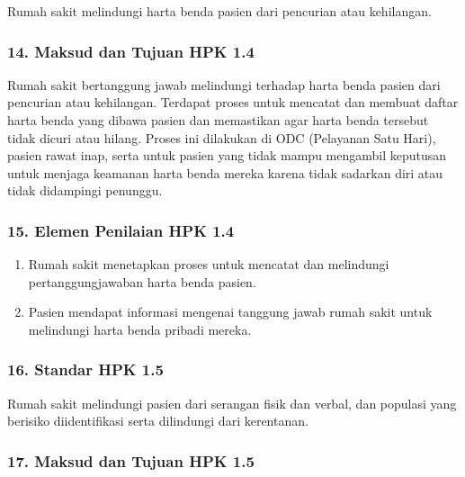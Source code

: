 \documentclass[
]{book}
\providecommand{\tightlist}{%
  \setlength{\itemsep}{0pt}\setlength{\parskip}{0pt}}
\begin{document}
Rumah sakit melindungi harta benda pasien dari pencurian atau kehilangan.

\hypertarget{maksud-dan-tujuan-hpk-1.4}{%
\subsubsection*{14. Maksud dan Tujuan HPK 1.4}\label{maksud-dan-tujuan-hpk-1.4}}

Rumah sakit bertanggung jawab melindungi terhadap harta benda pasien dari pencurian atau kehilangan. Terdapat proses untuk mencatat dan membuat daftar harta benda yang dibawa pasien dan memastikan agar harta benda tersebut tidak dicuri atau hilang. Proses ini dilakukan di ODC (Pelayanan Satu Hari), pasien rawat inap, serta untuk pasien yang tidak mampu mengambil keputusan untuk menjaga keamanan harta benda mereka karena tidak sadarkan diri atau tidak didampingi penunggu.

\hypertarget{elemen-penilaian-hpk-1.4}{%
\subsubsection*{15. Elemen Penilaian HPK 1.4}\label{elemen-penilaian-hpk-1.4}}

\begin{enumerate}
\def\labelenumi{\alph{enumi}.}
\tightlist
\item
  Rumah sakit menetapkan proses untuk mencatat dan melindungi pertanggungjawaban harta benda pasien.
\item
  Pasien mendapat informasi mengenai tanggung jawab rumah sakit untuk melindungi harta benda pribadi mereka.
\end{enumerate}

\hypertarget{standar-hpk-1.5}{%
\subsubsection*{16. Standar HPK 1.5}\label{standar-hpk-1.5}}

Rumah sakit melindungi pasien dari serangan fisik dan verbal, dan populasi yang berisiko diidentifikasi serta dilindungi dari kerentanan.

\hypertarget{maksud-dan-tujuan-hpk-1.5}{%
\subsubsection*{17. Maksud dan Tujuan HPK 1.5}\label{maksud-dan-tujuan-hpk-1.5}}
\end{document}
